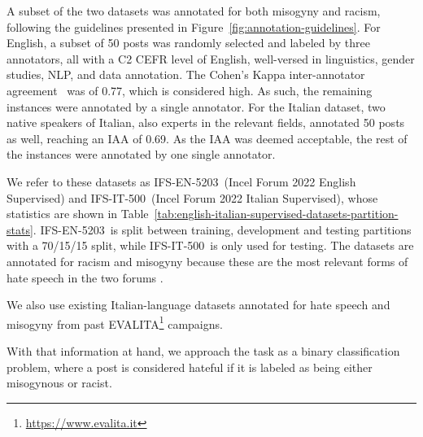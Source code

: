 \documentclass[11pt]{article}
\newcommand{\dsENclassification}{IFS-EN-5203}
\newcommand{\dsITclassification}{IFS-IT-500}
\begin{document}
A subset of the two datasets was annotated for both misogyny and racism, following the guidelines presented in Figure~\ref{fig:annotation-guidelines}.
For English, a subset of 50 posts was randomly selected and labeled by three annotators, all with a C2 CEFR level of English, well-versed in linguistics, gender studies, NLP, and data annotation. 
The Cohen's Kappa inter-annotator agreement~\cite{bobicev2017inter} was of 0.77, which is considered high.
As such, the remaining instances were annotated by a single annotator. For the Italian dataset, two native speakers of Italian, also experts in the relevant fields, annotated  50 posts as well, reaching an IAA of 0.69. As the IAA was deemed acceptable, the rest of the instances were annotated by one single annotator. 

We refer to these datasets as \dsENclassification\, (Incel Forum 2022 English Supervised) and \dsITclassification\, (Incel Forum 2022 Italian Supervised), 
whose statistics are shown in 
Table~\ref{tab:english-italian-supervised-datasets-partition-stats}. \dsENclassification~is split between training, development and testing partitions with a 70/15/15 split, while \dsITclassification~is only used for testing.
The datasets are annotated for racism and misogyny because these are the most relevant forms of hate speech in the two forums \cite{silva2016analyzing,ging2018special}.

We also use existing Italian-language datasets annotated for hate speech \cite{boscoOverviewEVALITA2018} and misogyny \cite{basileEVALITA2020Overview} from past EVALITA\footnote{\url{https://www.evalita.it}} campaigns.

With that information at hand, we approach the task as a binary classification problem, where a post is considered hateful if it is labeled as being either misogynous or racist.
\end{document}
